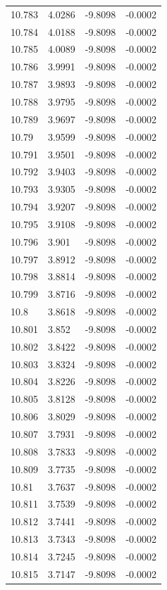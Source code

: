 \begin{tabular}{llll}
10.783 & 4.0286 & -9.8098 & -0.0002 \\
10.784 & 4.0188 & -9.8098 & -0.0002 \\
10.785 & 4.0089 & -9.8098 & -0.0002 \\
10.786 & 3.9991 & -9.8098 & -0.0002 \\
10.787 & 3.9893 & -9.8098 & -0.0002 \\
10.788 & 3.9795 & -9.8098 & -0.0002 \\
10.789 & 3.9697 & -9.8098 & -0.0002 \\
10.79 & 3.9599 & -9.8098 & -0.0002 \\
10.791 & 3.9501 & -9.8098 & -0.0002 \\
10.792 & 3.9403 & -9.8098 & -0.0002 \\
10.793 & 3.9305 & -9.8098 & -0.0002 \\
10.794 & 3.9207 & -9.8098 & -0.0002 \\
10.795 & 3.9108 & -9.8098 & -0.0002 \\
10.796 & 3.901 & -9.8098 & -0.0002 \\
10.797 & 3.8912 & -9.8098 & -0.0002 \\
10.798 & 3.8814 & -9.8098 & -0.0002 \\
10.799 & 3.8716 & -9.8098 & -0.0002 \\
10.8 & 3.8618 & -9.8098 & -0.0002 \\
10.801 & 3.852 & -9.8098 & -0.0002 \\
10.802 & 3.8422 & -9.8098 & -0.0002 \\
10.803 & 3.8324 & -9.8098 & -0.0002 \\
10.804 & 3.8226 & -9.8098 & -0.0002 \\
10.805 & 3.8128 & -9.8098 & -0.0002 \\
10.806 & 3.8029 & -9.8098 & -0.0002 \\
10.807 & 3.7931 & -9.8098 & -0.0002 \\
10.808 & 3.7833 & -9.8098 & -0.0002 \\
10.809 & 3.7735 & -9.8098 & -0.0002 \\
10.81 & 3.7637 & -9.8098 & -0.0002 \\
10.811 & 3.7539 & -9.8098 & -0.0002 \\
10.812 & 3.7441 & -9.8098 & -0.0002 \\
10.813 & 3.7343 & -9.8098 & -0.0002 \\
10.814 & 3.7245 & -9.8098 & -0.0002 \\
10.815 & 3.7147 & -9.8098 & -0.0002 \\

\end{tabular}
